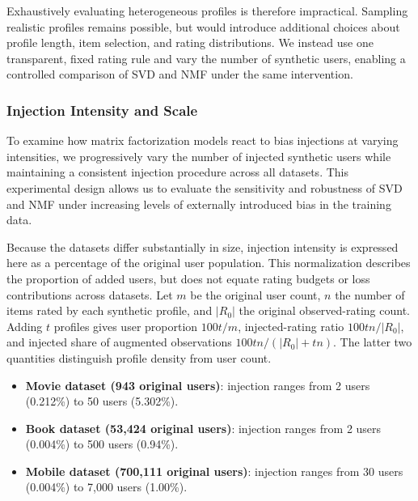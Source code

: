 \documentclass[information,article,submit,pdftex,moreauthors]{Definitions/mdpi}
\newif\ifrevisionnotes
\newcommand{\saracomment}[1]{\ifrevisionnotes\par\smallskip\noindent\textcolor{orange}{\textbf{Sara:} #1}\par\smallskip\fi}
\begin{document}
Exhaustively evaluating heterogeneous profiles is therefore impractical. Sampling realistic profiles remains possible, but would introduce additional choices about profile length, item selection, and rating distributions. We instead use one transparent, fixed rating rule and vary the number of synthetic users, enabling a controlled comparison of SVD and NMF under the same intervention.

\saracomment{Corrected MovieLens user percentages: 2/943 is approximately 0.212 percent and 50/943 is approximately 5.302 percent. Updated the overall maximum proportion. Added rating-budget measures because equal user percentages do not imply equal perturbation strength.}

\subsubsection{Injection Intensity and Scale}

To examine how matrix factorization models react to bias injections at varying intensities, we progressively vary the number of injected synthetic users while maintaining a consistent injection procedure across all datasets. This experimental design allows us to evaluate the sensitivity and robustness of SVD and NMF under increasing levels of externally introduced bias in the training data.

Because the datasets differ substantially in size, injection intensity is expressed here as a percentage of the original user population. This normalization describes the proportion of added users, but does not equate rating budgets or loss contributions across datasets. Let $m$ be the original user count, $n$ the number of items rated by each synthetic profile, and $|R_0|$ the original observed-rating count. Adding $t$ profiles gives user proportion $100t/m$, injected-rating ratio $100tn/|R_0|$, and injected share of augmented observations $100tn/(|R_0|+tn)$. The latter two quantities distinguish profile density from user count.

\begin{itemize}
    \item \textbf{Movie dataset (943 original users)}: injection ranges from 2 users (0.212\%) to 50 users (5.302\%).
    
    \item \textbf{Book dataset (53,424 original users)}: injection ranges from 2 users (0.004\%) to 500 users (0.94\%).
    
    \item \textbf{Mobile dataset (700,111 original users)}: injection ranges from 30 users (0.004\%) to 7,000 users (1.00\%).

    
\end{itemize}
\end{document}
